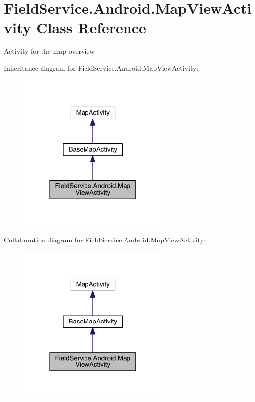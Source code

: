 \hypertarget{class_field_service_1_1_android_1_1_map_view_activity}{\section{Field\+Service.\+Android.\+Map\+View\+Activity Class Reference}
\label{class_field_service_1_1_android_1_1_map_view_activity}
}


Activity for the map overview  




Inheritance diagram for Field\+Service.\+Android.\+Map\+View\+Activity\+:
\nopagebreak
\begin{figure}[H]
\begin{center}
\leavevmode
\includegraphics[width=210pt]{class_field_service_1_1_android_1_1_map_view_activity__inherit__graph}
\end{center}
\end{figure}


Collaboration diagram for Field\+Service.\+Android.\+Map\+View\+Activity\+:
\nopagebreak
\begin{figure}[H]
\begin{center}
\leavevmode
\includegraphics[width=210pt]{class_field_service_1_1_android_1_1_map_view_activity__coll__graph}
\end{center}
\end{figure}
